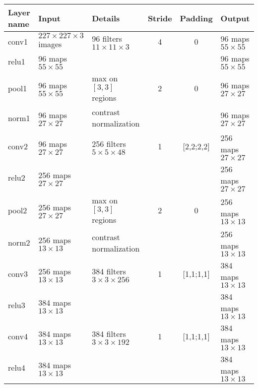 \begin{table}[h]
\begin{center}
 \begin{tabular}{|l||l||l|c|c||l|}
   \hline
   Layer name & Input                            & Details                                 & Stride & Padding   & Output                   \\
   \hline
   \hline
   conv1      & $227 \times 227 \times 3$ images & 96 filters $11 \times 11 \times 3$      & 4      & 0         & 96 maps $55 \times 55$   \\
   relu1      & 96 maps $55 \times 55$           &                                         &        &           & 96 maps $55 \times 55$   \\
   pool1      & 96 maps $55 \times 55$           & max on $[3,3]$ regions                  & 2      & 0         & 96 maps $27 \times 27$   \\
   norm1      & 96 maps $27 \times 27$           & contrast normalization                  &        &           & 96 maps $27 \times 27$   \\
   \hline
   conv2      & 96 maps $27 \times 27$           & 256 filters $5 \times 5 \times 48$      & 1      & [2,2;2,2] & 256 maps $27 \times 27$  \\
   relu2      & 256 maps $27 \times 27$          &                                         &        &           & 256 maps $27 \times 27$  \\
   pool2      & 256 maps $27 \times 27$          & max on $[3,3]$ regions                  & 2      & 0         & 256 maps $13 \times 13$  \\
   norm2      & 256 maps $13 \times 13$          & contrast normalization                  &        &           & 256 maps $13 \times 13$  \\
   \hline
   conv3      & 256 maps $13 \times 13$          & 384 filters $3 \times 3 \times 256$     & 1      & [1,1;1,1] & 384 maps $13 \times 13$  \\
   relu3      & 384 maps $13 \times 13$          &                                         &        &           & 384 maps $13 \times 13$  \\
   \hline
   conv4      & 384 maps $13 \times 13$          & 384 filters $3 \times 3 \times 192$     & 1      & [1,1;1,1] & 384 maps $13 \times 13$  \\
   relu4      & 384 maps $13 \times 13$          &                                         &        &           & 384 maps $13 \times 13$  \\

\end{tabular}
\end{center}
\end{table}
